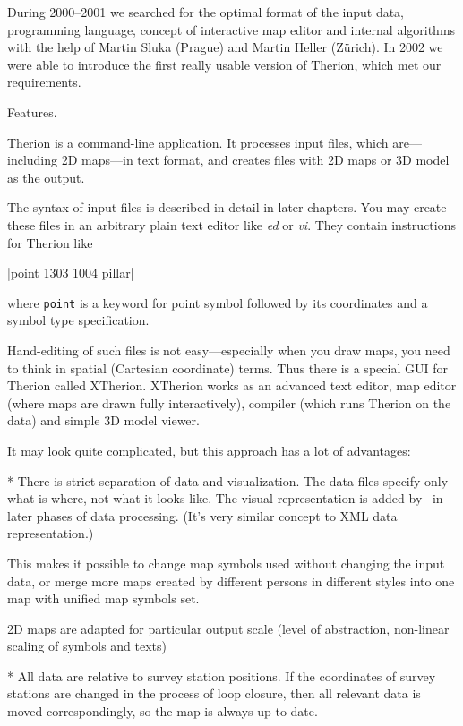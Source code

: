 During 2000--2001 we searched for the optimal format of the input data, programming 
language, concept of interactive map editor and internal algorithms with the 
help of Martin Sluka (Prague) and Martin Heller (Z\"urich). In 2002 we were able to 
introduce the first really usable version of Therion, which met our requirements.


\subchapter Features.

Therion is a command-line application. It processes input files, which 
are---including 2D maps---in text format, and creates files with 2D maps or 
3D model as the output.

The syntax of input files is described in detail in later chapters. 
You may create these files in an arbitrary plain text editor like 
{\it ed} or {\it vi}. They contain instructions for Therion like 

|point 1303 1004 pillar| 

where {\tt point} is a keyword for point symbol 
followed by its coordinates and a symbol type specification.

Hand-editing of such files is not easy---especially when you draw maps, you 
need to think in spatial (Cartesian coordinate) terms. Thus there is a special 
GUI for Therion called XTherion. XTherion works as an advanced text editor, map 
editor (where maps are drawn fully interactively), compiler (which runs
Therion on the data) and simple 3D model viewer.

It may look quite complicated, but this approach has a lot of advantages:

\list
* There is strict separation of data and visualization. The data files specify 
  only what is where, not what it looks like. The visual representation 
  is added by \MP\ in later phases of data processing. (It's very 
  similar concept to XML data representation.) 
  
  This makes it possible to change map symbols used without changing the 
  input data, or merge more maps created by different persons in different 
  styles into one map with unified map symbols set.

  2D maps are adapted for particular output scale (level of abstraction,
  non-linear scaling of symbols and texts)
  
* All data are relative to survey station positions. If the coordinates
  of survey stations are changed in the process of loop closure, then all relevant
  data is moved correspondingly, so the map is always up-to-date.

